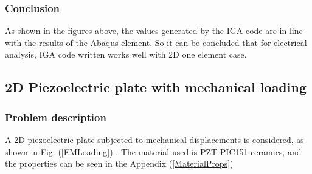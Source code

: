 \documentclass[11pt]{article}
\begin{document}
\subsubsection{Conclusion}
As shown in the figures above, the values generated by the IGA code are in line with the results of the Abaqus element. So it can be concluded that for electrical analysis, IGA code written works well with 2D one element case.



\subsection{2D Piezoelectric plate with mechanical loading}
\subsubsection{Problem description} \label{2DPPWMLPD}
A 2D piezoelectric plate subjected to mechanical displacements is considered, as shown in Fig. (\ref{EMLoading}) . The material used is PZT-PIC151 ceramics, and the properties can be seen in the Appendix (\ref{MaterialProps})
\end{document}
